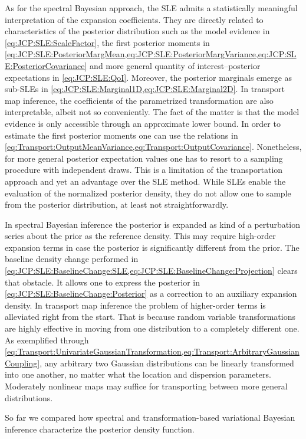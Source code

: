 As for the spectral Bayesian approach, the SLE admits a statistically meaningful interpretation of the expansion coefficients.
They are directly related to characteristics of the posterior distribution such as the model evidence in \cref{eq:JCP:SLE:ScaleFactor},
the first posterior moments in \cref{eq:JCP:SLE:PosteriorMargMean,eq:JCP:SLE:PosteriorMargVariance,eq:JCP:SLE:PosteriorCovariance}
and more general quantity of interest--posterior expectations in \cref{eq:JCP:SLE:QoI}.
Moreover, the posterior marginals emerge as sub-SLEs in \cref{eq:JCP:SLE:Marginal1D,eq:JCP:SLE:Marginal2D}.
In transport map inference, the coefficients of the parametrized transformation are also interpretable, albeit not so conveniently.
The fact of the matter is that the model evidence is only accessible through an approximate lower bound.
In order to estimate the first posterior moments one can use the relations in \cref{eq:Transport:OutputMeanVariance,eq:Transport:OutputCovariance}.
Nonetheless, for more general posterior expectation values one has to resort to a sampling procedure with independent draws.
This is a limitation of the transportation approach and yet an advantage over the SLE method.
While SLEs enable the evaluation of the normalized posterior density, they do not allow one to sample from the posterior distribution, at least not straightforwardly.
\par %
In spectral Bayesian inference the posterior is expanded as kind of a perturbation series about the prior as the reference density.
This may require high-order expansion terms in case the posterior is significantly different from the prior.
The baseline density change performed in \cref{eq:JCP:SLE:BaselineChange:SLE,eq:JCP:SLE:BaselineChange:Projection} clears that obstacle.
It allows one to express the posterior in \cref{eq:JCP:SLE:BaselineChange:Posterior} as a correction to an auxiliary expansion density.
In transport map inference the problem of higher-order terms is alleviated right from the start.
That is because random variable transformations are highly effective in moving from one distribution to a completely different one.
As exemplified through \cref{eq:Transport:UnivariateGaussianTransformation,eq:Transport:ArbitraryGaussianCoupling},
any arbitrary two Gaussian distributions can be linearly transformed into one another, no matter what the location and dispersion parameters.
Moderately nonlinear maps may suffice for transporting between more general distributions.
\par %
So far we compared how spectral and transformation-based variational Bayesian inference characterize the posterior density function.

